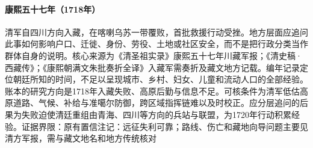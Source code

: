 \hypertarget{social:EQ-1718-QING-TIBET-EXPEDITION}{}\paragraph{康熙五十七年（1718年）}清军自四川方向入藏，在喀喇乌苏一带覆败，首批救援行动受挫。地方层面应追问此事如何影响户口、迁徙、身份、劳役、土地或社区安全，而不是把行政分类当作群体自身的说明。核心来源为《清圣祖实录》康熙五十七年川藏军报；《清史稿·西藏传》；《康熙朝满文朱批奏折全译》入藏军需奏折及藏文地方记载。编年记录定位朝廷所知的时间，不足以呈现城市、乡村、妇女、儿童和流动人口的全部经验。账本的研究方向是1718年入藏失败、高原后勤与信息不足。可核条件为清军低估高原道路、气候、补给与准噶尔防御，跨区域指挥链难以及时校正。应分层追问的后果为失败迫使清廷重组由青海、四川等方向的兵站与联盟，为1720年行动积累经验。证据界限：原有置信注记：远征失利可靠；路线、伤亡和藏地向导问题主要见清方军报，需与藏文地名和地方传统核对
